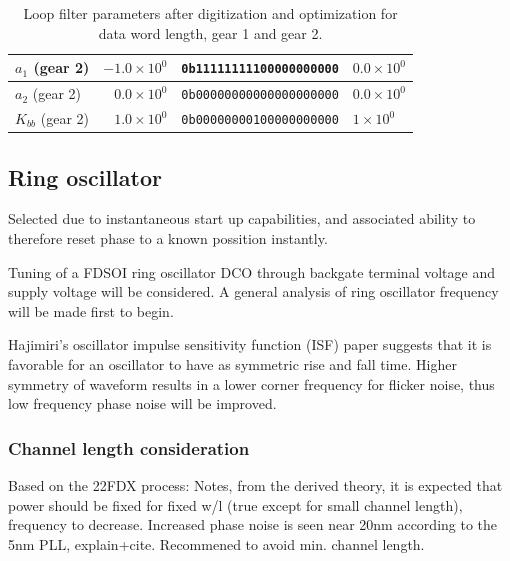 \begin{table}[h!]
\begin{tabular}{|l|r|r|l|}
				\hline 
				\rule[-1ex]{0pt}{2.5ex} \textbf{$a_1$} {\color{blue} (gear 2)} & $-1.0\times10^0$ & \texttt{0b11111111100000000000} & $0.0\times10^0$ \\ 
				\hline 
				\rule[-1ex]{0pt}{2.5ex} \textbf{$a_2$} {\color{blue} (gear 2)} & $0.0\times10^0$ & \texttt{0b00000000000000000000} & $0.0\times10^0$ \\ 
				\hline 
				\rule[-1ex]{0pt}{2.5ex} \textbf{$K_{bb}$} {\color{blue} (gear 2)} & $1.0\times10^0$ & \texttt{0b00000000100000000000} & $1\times10^0$ \\ 
				\hline 
			\end{tabular} 
			\caption{Loop filter parameters after digitization and optimization for data word length, gear 1 and gear 2.}
			\label{dig_filter_params_fast}
		\end{table}  

\FloatBarrier\pagebreak
\subsection{Ring oscillator}

	Selected due to instantaneous start up capabilities, and associated ability to therefore reset phase to a known possition instantly.

		Tuning of a FDSOI ring oscillator DCO through backgate terminal voltage and supply voltage will be considered. A general analysis of ring oscillator frequency will be made first to begin.

	Hajimiri's oscillator impulse sensitivity function (ISF) paper \cite{Hajimiri1998} suggests that it is favorable for an oscillator to have as symmetric rise and fall time. Higher symmetry of waveform results in a lower corner frequency for flicker noise, thus low frequency phase noise will be improved.


	\subsubsection{Channel length consideration}
	Based on the 22FDX process:
	Notes, from the derived theory, it is expected that power should be fixed for fixed w/l (true except for small channel length), frequency to decrease. Increased phase noise is seen near 20nm according to the 5nm PLL, explain+cite. Recommened to avoid min. channel length. 


